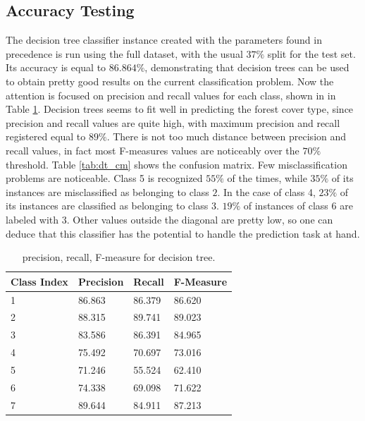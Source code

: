 \documentclass[a4paper, 10pt]{article}
\begin{document}
 
\subsection{Accuracy Testing}

The decision tree classifier instance created with the parameters found in precedence is run using the full dataset, with the usual $37\%$ split for the test set. Its accuracy is equal to $86.864\%$, demonstrating that decision trees can be used to obtain pretty good results on the current classification problem. Now the attention is focused on precision and recall values for each class, shown in in Table \ref{tab:dt_test_pr}. Decision trees seems to fit well in predicting the forest cover type, since precision and recall values are quite high, with maximum precision and recall registered equal to $89\%$. There is not too much distance between precision and recall values, in fact most F-measures values are noticeably over the $70\%$ threshold. Table \ref{tab:dt_cm} shows the confusion matrix. Few misclassification problems are noticeable. Class 5 is recognized $55\%$ of the times, while $35\%$ of its instances are misclassified as belonging to class $2$. In the case of class 4, $23\%$ of its instances are classified as belonging to class 3. $19\%$ of instances of class 6 are labeled with $3$. Other values outside the diagonal are pretty low, so one can deduce that this classifier has the potential to handle the prediction task at hand. 
 
\begin{table}[H]
\centering
\begin{tabular}{|l|l|l|l|}
\hline
\textbf{Class Index} & \textbf{Precision} & \textbf{Recall} & \textbf{F-Measure}\\\hline
1 & 86.863 & 86.379& 86.620\\\hline
2 & 88.315 & 89.741& 89.023\\\hline
3 & 83.586 & 86.391& 84.965\\\hline
4 & 75.492 & 70.697& 73.016\\\hline
5 & 71.246 & 55.524& 62.410\\\hline
6 & 74.338 & 69.098& 71.622\\\hline
7 & 89.644 & 84.911& 87.213\\\hline
\end{tabular}
\caption{precision, recall, F-measure for decision tree.}
\label{tab:dt_test_pr}
\end{table}
\end{document}
